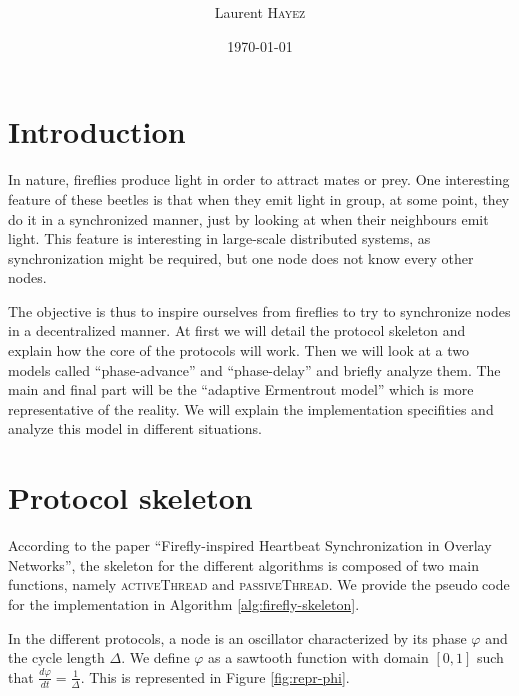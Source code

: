 \documentclass[a4paper, 11pt]{article}
\title{%
  \normalfont{\bfseries{\rule{\linewidth}{2pt} Large-Scale Distributed Systems\\Project 3: Firefly-inspired synchronization\\ %
    \vspace{-0.4cm}  \rule{\linewidth}{2pt}}}
  }
\author{Laurent \textsc{Hayez}}
\date{\today}
\renewcommand{\phi}{\varphi}
\theoremstyle{plain}
\theoremstyle{definition}
\begin{document}
\renewcommand{\proofname}{{\scshape Proof}}
\renewcommand{\labelitemi}{\textbullet}


\maketitle

\renewcommand{\contentsname}{Table of contents}
\tableofcontents



\section{Introduction}
\label{sec:introduction}

  In nature, fireflies produce light in order to attract mates or prey. One interesting feature of these
  beetles is that when they emit light in group, at some point, they do it in a synchronized manner, just by
  looking at when their neighbours emit light. This feature is interesting in large-scale distributed systems,
  as synchronization might be required, but one node does not know every other nodes. 

  The objective is thus to inspire ourselves from fireflies to try to synchronize nodes in a decentralized
  manner. At first we will detail the protocol skeleton and explain how the core of the protocols will
  work. Then we will look at a two models called ``phase-advance'' and ``phase-delay'' and briefly analyze
  them. The main and final part will be the ``adaptive Ermentrout model'' which is more representative of
  the reality. We will explain the implementation specifities and analyze this model in different situations.
  
  

\section{Protocol skeleton}
\label{sec:impl-skel}

  According to the paper ``Firefly-inspired Heartbeat Synchronization in Overlay Networks'', the skeleton for
  the different algorithms is composed of two main functions, namely \textsc{activeThread} and
  \textsc{passiveThread}. We provide the pseudo code for the implementation in Algorithm
  \ref{alg:firefly-skeleton}.

  In the different protocols, a node is an oscillator characterized by its phase $\phi$ and the cycle length
  $\Delta$. We define $\phi$ as a sawtooth function with domain $[0,1]$ such that $\frac{d\phi}{dt} =
  \frac{1}{\Delta}$. This is represented in Figure \ref{fig:repr-phi}.
\end{document}
